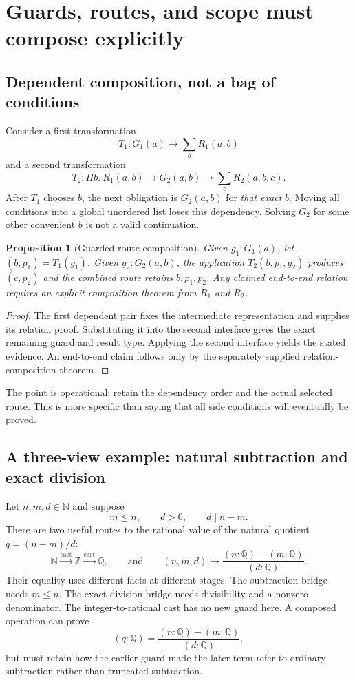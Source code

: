 \documentclass[11pt,a4paper]{article}
\newcommand{\N}{\mathbb N}
\newcommand{\Z}{\mathbb Z}
\newcommand{\Q}{\mathbb Q}
\newtheorem{proposition}{Proposition}[section]
\theoremstyle{definition}
\theoremstyle{remark}
\begin{document}
\section{Guards, routes, and scope must compose explicitly}\label{sec:composition}
\subsection{Dependent composition, not a bag of conditions}
Consider a first transformation
\[
T_1:G_1(a)\to\sum_b R_1(a,b)
\]
and a second transformation
\[
T_2:\Pi b.\ R_1(a,b)\to G_2(a,b)\to\sum_c R_2(a,b,c).
\]
After $T_1$ chooses $b$, the next obligation is $G_2(a,b)$ for \emph{that exact} $b$. Moving all conditions into a global unordered list loses this dependency. Solving $G_2$ for some other convenient $b$ is not a valid continuation.

\begin{proposition}[Guarded route composition]
Given $g_1:G_1(a)$, let $(b,p_1)=T_1(g_1)$. Given $g_2:G_2(a,b)$, the application $T_2(b,p_1,g_2)$ produces $(c,p_2)$ and the combined route retains $b,p_1,p_2$. Any claimed end-to-end relation requires an explicit composition theorem from $R_1$ and $R_2$.
\end{proposition}
\begin{proof}
The first dependent pair fixes the intermediate representation and supplies its relation proof. Substituting it into the second interface gives the exact remaining guard and result type. Applying the second interface yields the stated evidence. An end-to-end claim follows only by the separately supplied relation-composition theorem.
\end{proof}
The point is operational: retain the dependency order and the actual selected route. This is more specific than saying that all side conditions will eventually be proved.

\subsection{A three-view example: natural subtraction and exact division}
Let $n,m,d\in\N$ and suppose
\[
m\le n,\qquad d>0,\qquad d\mid n-m.
\]
There are two useful routes to the rational value of the natural quotient $q=(n-m)/d$:
\[
\N\xrightarrow{\text{cast}}\Z\xrightarrow{\text{cast}}\Q,
\qquad\text{and}\qquad
(n,m,d)\mapsto\frac{(n:\Q)-(m:\Q)}{(d:\Q)}.
\]
Their equality uses different facts at different stages. The subtraction bridge needs $m\le n$. The exact-division bridge needs divisibility and a nonzero denominator. The integer-to-rational cast has no new guard here. A composed operation can prove
\[
(q:\Q)=\frac{(n:\Q)-(m:\Q)}{(d:\Q)},
\]
but must retain how the earlier guard made the later term refer to ordinary subtraction rather than truncated subtraction.
\end{document}
